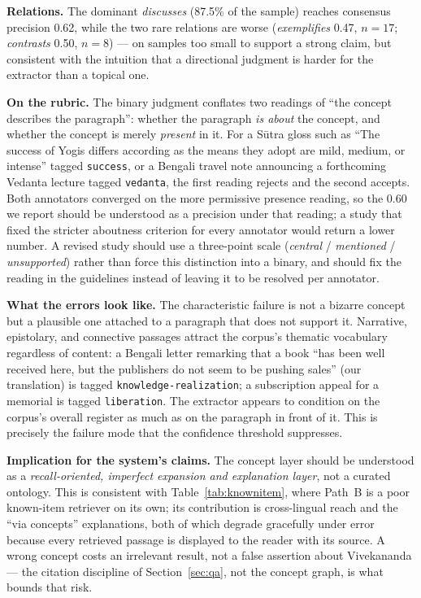 \documentclass[pdflatex,sn-mathphys-num]{sn-jnl}
\begin{document}
\textbf{Relations.} The dominant \emph{discusses} (87.5\% of the sample)
reaches consensus precision 0.62, while the two rare relations are worse
(\emph{exemplifies} 0.47, $n=17$; \emph{contrasts} 0.50, $n=8$) --- on
samples too small to support a strong claim, but consistent with the
intuition that a directional judgment is harder for the extractor than a
topical one.

\textbf{On the rubric.} The binary judgment conflates two readings of
``the concept describes the paragraph'': whether the paragraph \emph{is
about} the concept, and whether the concept is merely \emph{present} in
it. For a S\=utra gloss such as ``The success of Yogis differs according
as the means they adopt are mild, medium, or intense'' tagged
\texttt{success}, or a Bengali travel note announcing a forthcoming
Vedanta lecture tagged \texttt{vedanta}, the first reading rejects and
the second accepts. Both annotators converged on the more permissive
presence reading, so the 0.60 we report should be understood as a
precision under that reading; a study that fixed the stricter aboutness
criterion for every annotator would return a lower number. A revised
study should use a three-point scale (\emph{central} / \emph{mentioned} /
\emph{unsupported}) rather than force this distinction into a binary, and
should fix the reading in the guidelines instead of leaving it to be
resolved per annotator.

\textbf{What the errors look like.} The characteristic failure is not a
bizarre concept but a plausible one attached to a paragraph that does not
support it. Narrative, epistolary, and connective passages attract the
corpus's thematic vocabulary regardless of content: a Bengali letter
remarking that a book ``has been well received here, but the publishers
do not seem to be pushing sales'' (our translation) is tagged
\texttt{knowledge-realization}; a subscription appeal for a memorial is
tagged \texttt{liberation}. The
extractor appears to condition on the corpus's overall register as much
as on the paragraph in front of it. This is precisely the failure mode
that the confidence threshold suppresses.

\textbf{Implication for the system's claims.} The concept layer should
be understood as a \emph{recall-oriented, imperfect expansion and
explanation layer}, not a curated ontology. This is consistent with
Table~\ref{tab:knownitem}, where Path~B is a poor known-item retriever
on its own; its contribution is cross-lingual reach and the
``via concepts'' explanations, both of which degrade gracefully under
error because every retrieved passage is displayed to the reader with
its source. A wrong concept costs an irrelevant result, not a false
assertion about Vivekananda --- the citation discipline of
Section~\ref{sec:qa}, not the concept graph, is what bounds that risk.
\end{document}
